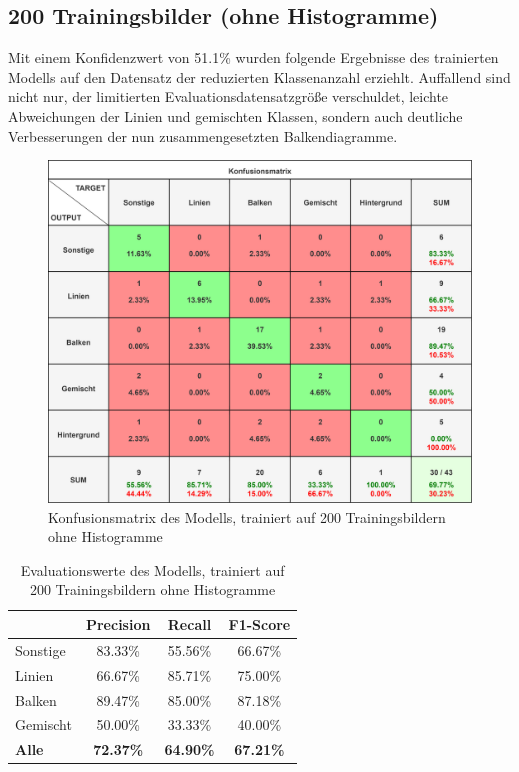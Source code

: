\subsection*{200 Trainingsbilder (ohne Histogramme)}
Mit einem Konfidenzwert von 51.1\% wurden folgende Ergebnisse des trainierten Modells auf den Datensatz der reduzierten Klassenanzahl erziehlt. Auffallend sind nicht nur, der limitierten Evaluationsdatensatzgröße verschuldet, leichte Abweichungen der Linien und gemischten Klassen, sondern auch deutliche Verbesserungen der nun zusammengesetzten Balkendiagramme.

\begin{figure}[H]
    \centering
    \captionsetup{width=1\linewidth}
    \includegraphics[width=1\textwidth]{Experimente/img/detect/2_val@0.511_200_nohisto/konfusionsmatrix.png}
    \caption{ Konfusionsmatrix des Modells, trainiert auf 200 Trainingsbildern ohne Histogramme}
    \label{fig:extraction_output}
\end{figure}

\begin{table}[H]
    \centering
    \begin{tabular}{|l|c|c|c|}
        \hline
        \rowcolor[HTML]{EFEFEF}
                      & Precision        & Recall           & F1-Score         \\ \hline
        Sonstige      & 83.33\%          & 55.56\%          & 66.67\%          \\ \hline
        Linien        & 66.67\%          & 85.71\%          & 75.00\%          \\ \hline
        Balken        & 89.47\%          & 85.00\%          & 87.18\%          \\ \hline
        Gemischt      & 50.00\%          & 33.33\%          & 40.00\%          \\ \hline
        \textbf{Alle} & \textbf{72.37\%} & \textbf{64.90\%} & \textbf{67.21\%} \\ \hline
    \end{tabular}
    \caption{Evaluationswerte des Modells, trainiert auf 200 Trainingsbildern ohne Histogramme}
\end{table}

